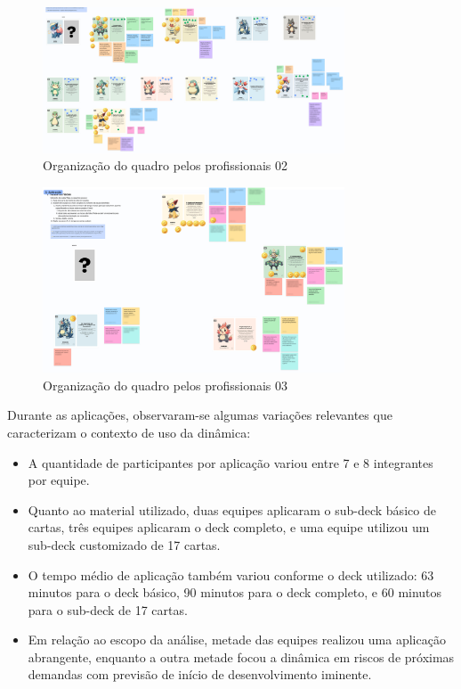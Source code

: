\documentclass[
	12pt,
	openright,
	twoside,
	a4paper,
	english,
	brazil
	]{abntex2}
\begin{document}
\begin{figure}[H]
  \centering
	\caption{\label{bridge-print-quadro-2} Organização do quadro pelos profissionais 02}
  \includegraphics[width=0.8\textwidth]{bridge-print-quadro-2}
\end{figure}

\begin{figure}[H]
  \centering
	\caption{\label{bridge-print-quadro-3} Organização do quadro pelos profissionais 03}
  \includegraphics[width=0.8\textwidth]{bridge-print-quadro-3}
\end{figure}

Durante as aplicações, observaram-se algumas variações relevantes que caracterizam o contexto de uso da dinâmica:
\begin{itemize}
  \item A quantidade de participantes por aplicação variou entre 7 e 8 integrantes por equipe.
  \item Quanto ao material utilizado, duas equipes aplicaram o sub-deck básico de cartas, três equipes aplicaram o deck completo, e uma equipe utilizou um sub-deck customizado de 17 cartas.
  \item O tempo médio de aplicação também variou conforme o deck utilizado: 63 minutos para o deck básico, 90 minutos para o deck completo, e 60 minutos para o sub-deck de 17 cartas.
  \item Em relação ao escopo da análise, metade das equipes realizou uma aplicação abrangente, enquanto a outra metade focou a dinâmica em riscos de próximas demandas com previsão de início de desenvolvimento iminente.
\end{itemize}
\end{document}
